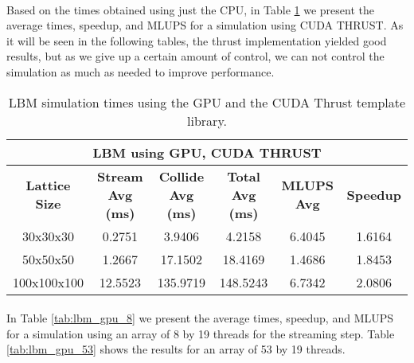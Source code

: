 \paragraph{}Based on the times obtained using just the CPU, in Table \ref{tab:lbm_gpu_thrust} we present the average times, speedup, and MLUPS for a simulation using CUDA THRUST. As it will be seen in the following tables, the thrust implementation yielded good results, but as we give up a certain amount of control, we can not control the simulation as much as needed to improve performance.

\begin{table}[htbp]
  \centering
    \begin{tabular}{|c|c|c|c|c|c|}
    \toprule
    \multicolumn{6}{c}{\textbf{LBM using GPU, CUDA THRUST}} \\
    \midrule
    \textbf{Lattice Size	} & \textbf{Stream Avg (ms)} &	\textbf{ Collide Avg (ms)} & \textbf{Total Avg (ms)} & \textbf{MLUPS Avg} &\textbf{Speedup}\\
    30x30x30	&0.2751 &	3.9406 	&4.2158 	&6.4045 	&1.6164 \\
50x50x50&	1.2667 &	17.1502 	&18.4169 &	1.4686 &	1.8453 \\
100x100x100&	12.5523 	&135.9719 &	148.5243&	6.7342 &	2.0806  \\

    \bottomrule
    \end{tabular}%
       \caption{LBM simulation times using the GPU and the CUDA Thrust template library.}
  \label{tab:lbm_gpu_thrust}%
\end{table}%

\paragraph{}In Table \ref{tab:lbm_gpu_8} we present the average times, speedup, and MLUPS for a simulation using an array of 8 by 19 threads for the streaming step. Table \ref{tab:lbm_gpu_53} shows the results for  an array of 53 by 19 threads.



